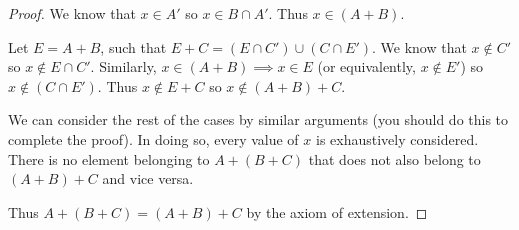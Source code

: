 \documentclass[12pt]{article}
\begin{document}
\begin{proof}
    We know that $x \in A'$ so $x \in B \cap A'$. Thus $x \in (A + B)$.

    Let $E = A + B$, such that $E + C = (E \cap C') \cup (C \cap E')$. We know that $x \notin C'$ so
    $x \notin E \cap C'$. Similarly, $x \in (A + B) \implies x \in E$ (or equivalently, $x \notin E'$)
    so $x \notin (C \cap E')$. Thus $x \notin E + C$ so $x \notin (A + B) + C$.

    We can consider the rest of the cases by similar arguments (you should do this to complete the proof). In doing so, every value of
    $x$ is exhaustively considered. There is no element belonging to $A + (B + C)$ that does not also
    belong to $(A + B) + C$ and vice versa.

    Thus $A + (B + C) = (A + B) + C$ by the axiom of extension.
\end{proof}
\end{document}
